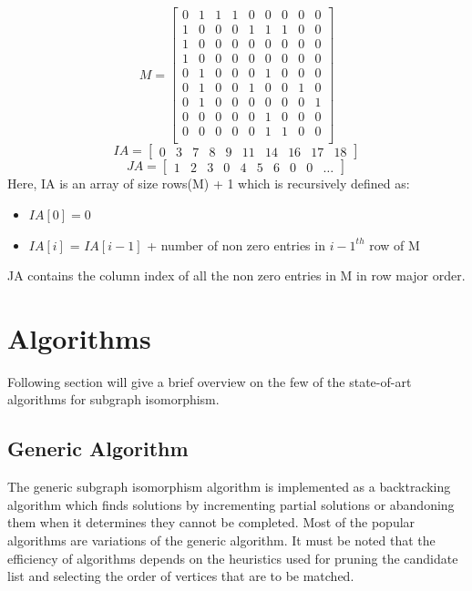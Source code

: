 \documentclass[
10pt, %
a4paper, %
oneside, %
headinclude,footinclude, %
BCOR5mm, %
]{scrartcl}
\begin{document}
\[
    M =
    \begin{bmatrix}
        0 & 1 & 1 & 1 & 0 & 0 & 0 & 0 & 0\\
        1 & 0 & 0 & 0 & 1 & 1 & 1 & 0 & 0\\
        1 & 0 & 0 & 0 & 0 & 0 & 0 & 0 & 0\\
        1 & 0 & 0 & 0 & 0 & 0 & 0 & 0 & 0\\
        0 & 1 & 0 & 0 & 0 & 1 & 0 & 0 & 0\\
        0 & 1 & 0 & 0 & 1 & 0 & 0 & 1 & 0\\
        0 & 1 & 0 & 0 & 0 & 0 & 0 & 0 & 1\\
        0 & 0 & 0 & 0 & 0 & 1 & 0 & 0 & 0\\
        0 & 0 & 0 & 0 & 0 & 1 & 1 & 0 & 0\\
    \end{bmatrix}
\]
\[
    IA = 
    \begin{bmatrix}
        0 & 3 & 7 & 8 & 9 & 11 & 14 & 16 & 17 & 18
    \end{bmatrix}
\] 
\[
    JA =
    \begin{bmatrix}
        1 & 2 & 3 & 0 & 4 & 5 & 6 & 0 & 0 & \dots
    \end{bmatrix}
\]
Here, IA is an array of size rows(M) + 1 which is recursively defined as:
\begin{itemize}
    \item $IA[0] = 0$
    \item $IA[i]$ = $IA[i - 1]$ + number of non zero entries in $i - 1^{th}$ row of M
\end{itemize}
JA contains the column index of all the non zero entries in M in row major order.
\section{Algorithms}

Following section will give a brief overview on the few of the state-of-art algorithms\cite{comparision} for subgraph isomorphism.

\subsection{Generic Algorithm}

The generic subgraph isomorphism algorithm is implemented
as a backtracking algorithm which finds solutions
by incrementing partial solutions or abandoning them when
it determines they cannot be completed. Most of the popular algorithms are variations of the generic algorithm. It must be noted that the efficiency of algorithms depends on the heuristics used for pruning the candidate list and selecting the order of vertices that are to be matched.
\end{document}
